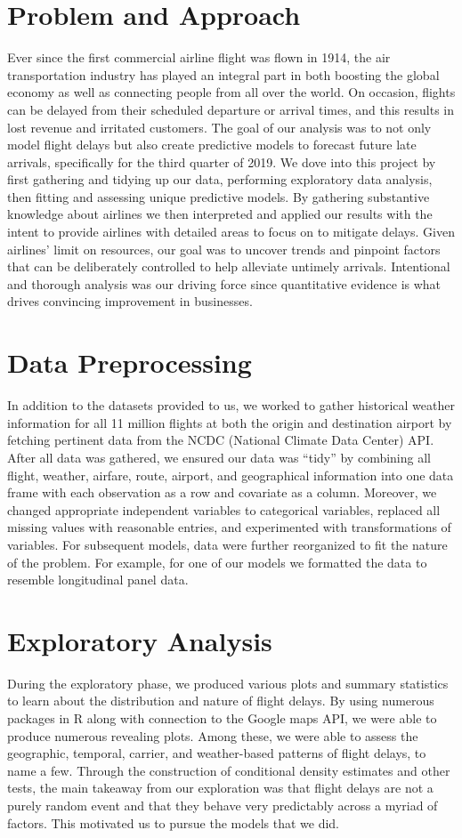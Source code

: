 \documentclass[12pt, a4paper, openany]{book}
\newcommand\tab[1][1cm]{\hspace*{#1}}
\begin{document}
	\section{Problem and Approach}
\tab Ever since the first commercial airline flight was flown in 1914, the air transportation industry has played an integral part in both boosting the global economy as well as connecting people from all over the world. On occasion, flights can be delayed from their scheduled departure or arrival times, and this results in lost revenue and irritated customers. The goal of our analysis was to not only model flight delays but also create predictive models to forecast future late arrivals, specifically for the third quarter of 2019. We dove into this project by first gathering and tidying up our data, performing exploratory data analysis, then fitting and assessing unique predictive models. By gathering substantive knowledge about airlines we then interpreted and applied our results with the intent to provide airlines with detailed areas to focus on to mitigate delays. Given airlines' limit on resources, our goal was to uncover trends and pinpoint factors that can be deliberately controlled to help alleviate untimely arrivals. Intentional and thorough analysis was our driving force since quantitative evidence is what drives convincing improvement in businesses.
	\section{Data Preprocessing}
\tab In addition to the datasets provided to us, we worked to gather historical weather information for all 11 million flights at both the origin and destination airport by fetching pertinent data from the NCDC (National Climate Data Center) API. After all data was gathered, we ensured our data was “tidy” by combining all flight, weather, airfare, route, airport, and geographical information into one data frame with each observation as a row and covariate as a column. Moreover, we changed appropriate independent variables to categorical variables, replaced all missing values with reasonable entries, and experimented with transformations of variables. For subsequent models, data were further reorganized to fit the nature of the problem. For example, for one of our models we formatted the data to resemble longitudinal panel data. 
	\section{Exploratory Analysis}
\tab During the exploratory phase, we produced various plots and summary statistics to learn about the distribution and nature of flight delays. By using numerous packages in R along with connection to the Google maps API, we were able to produce numerous revealing plots. Among these, we were able to assess the geographic, temporal, carrier, and weather-based patterns of flight delays, to name a few. Through the construction of conditional density estimates and other tests, the main takeaway from our exploration was that flight delays are not a purely random event and that they behave very predictably across a myriad of factors. This motivated us to pursue the models that we did. 
\end{document}
